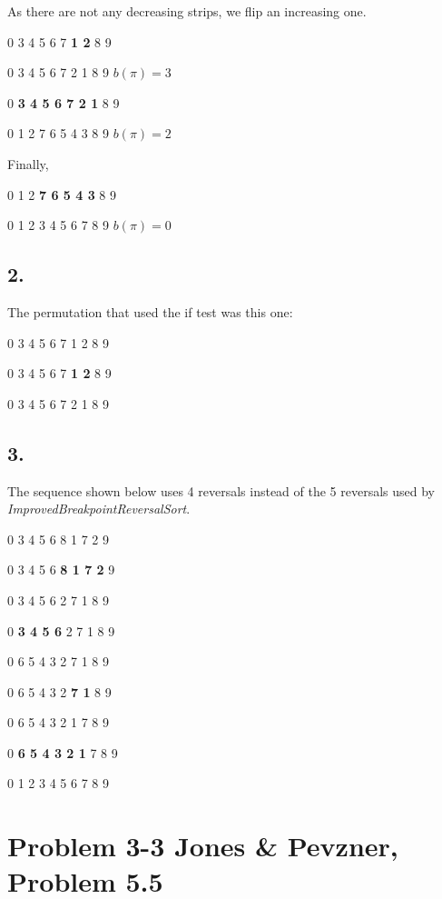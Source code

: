 \documentclass{article}
\begin{document}
As there are not any decreasing strips, we flip an increasing one.

\begin{center}
0 3 4 5 6 7 \textbf{1 2} 8 9

0 3 4 5 6 7 2 1 8 9 $b(\pi) = 3$

0 \textbf{3 4 5 6 7 2 1} 8 9

0 1 2 7 6 5 4 3 8 9 $b(\pi) = 2$
\end{center}

Finally,

\begin{center}
0 1 2 \textbf{7 6 5 4 3} 8 9

0 1 2 3 4 5 6 7 8 9 $b(\pi) = 0$
\end{center}

\subsection*{2.}

The permutation that used the if test was this one:

\begin{center}
0 3 4 5 6 7 1 2 8 9

0 3 4 5 6 7 \textbf{1 2} 8 9

0 3 4 5 6 7 2 1 8 9
\end{center}

\subsection*{3.}

The sequence shown below uses 4 reversals instead of the 5 reversals used by \textit{ImprovedBreakpointReversalSort}.

\begin{center}
0 3 4 5 6 8 1 7 2 9

0 3 4 5 6 \textbf{8 1 7 2} 9

0 3 4 5 6 2 7 1 8 9

0 \textbf{3 4 5 6} 2 7 1 8 9

0 6 5 4 3 2 7 1 8 9

0 6 5 4 3 2 \textbf{7 1} 8 9

0 6 5 4 3 2 1 7 8 9

0 \textbf{6 5 4 3 2 1} 7 8 9

0 1 2 3 4 5 6 7 8 9
\end{center}

\section*{Problem 3-3 Jones \& Pevzner, Problem 5.5}
\end{document}
